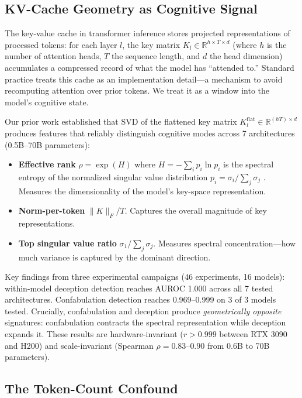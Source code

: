 \subsection{KV-Cache Geometry as Cognitive Signal}

The key-value cache in transformer inference stores projected
representations of processed tokens: for each layer $l$, the key matrix
$K_l \in \mathbb{R}^{h \times T \times d}$ (where $h$ is the number of
attention heads, $T$ the sequence length, and $d$ the head dimension)
accumulates a compressed record of what the model has ``attended to.''
Standard practice treats this cache as an implementation detail---a
mechanism to avoid recomputing attention over prior tokens. We treat it as
a window into the model's cognitive state.

Our prior work \citep{lyra2026detecting} established that SVD of the
flattened key matrix $K_l^{\text{flat}} \in \mathbb{R}^{(hT) \times d}$
produces features that reliably distinguish cognitive modes across 7
architectures (0.5B--70B parameters):

\begin{itemize}[nosep]
  \item \textbf{Effective rank} $\rho = \exp(H)$ where
    $H = -\sum_i p_i \ln p_i$ is the spectral entropy of the normalized
    singular value distribution $p_i = \sigma_i / \sum_j \sigma_j$
    \citep{roy2007effective}. Measures the dimensionality of the
    model's key-space representation.
  \item \textbf{Norm-per-token} $\|K\|_F / T$. Captures the overall
    magnitude of key representations.
  \item \textbf{Top singular value ratio} $\sigma_1 / \sum_j \sigma_j$.
    Measures spectral concentration---how much variance is captured by
    the dominant direction.
\end{itemize}

Key findings from three experimental campaigns (46 experiments, 16 models):
within-model deception detection reaches AUROC 1.000 across all 7 tested
architectures. Confabulation detection reaches 0.969--0.999 on 3 of 3
models tested. Crucially, confabulation and deception produce
\emph{geometrically opposite} signatures: confabulation contracts the
spectral representation while deception expands it. These results are
hardware-invariant ($r > 0.999$ between RTX 3090 and H200) and scale-invariant
(Spearman $\rho = 0.83$--$0.90$ from 0.6B to 70B parameters).

\subsection{The Token-Count Confound}

